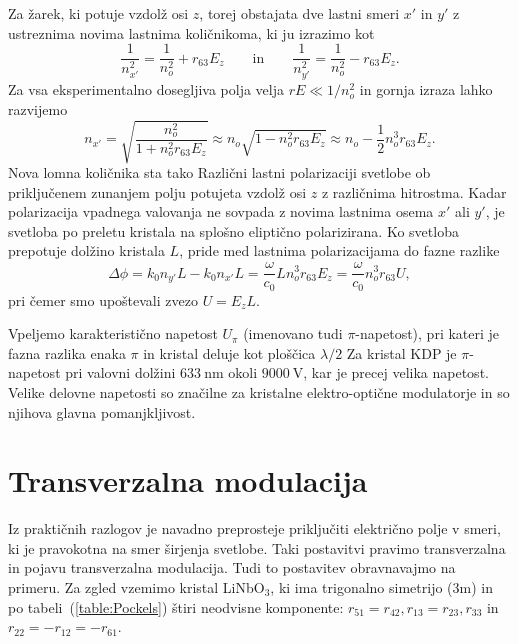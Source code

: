 Za žarek, 
ki potuje vzdolž osi $z$, torej obstajata dve lastni smeri $x'$ in $y'$ z ustreznima
novima lastnima količnikoma, ki ju izrazimo kot
\begin{equation}
\frac{1}{n_{x'}^2} = \frac{1}{n_o^2}+ r_{63}E_z \qquad \mathrm{in} \qquad 
\frac{1}{n_{y'}^2} = \frac{1}{n_o^2}- r_{63}E_z. 
\end{equation}
Za vsa eksperimentalno dosegljiva polja velja $rE\ll1/n_o^2$ in 
gornja izraza lahko razvijemo
\begin{equation}
n_{x'} = \sqrt{\frac{n_o^2}{1+ n_o^2 r_{63}E_z}} \approx n_o \sqrt{1- n_o^2 r_{63}E_z} \approx
n_o - \frac{1}{2}n_o^3 r_{63}E_z.
\end{equation}
Nova lomna količnika sta tako 
Različni lastni polarizaciji svetlobe  ob priključenem zunanjem polju potujeta vzdolž osi $z$ z različnima hitrostma. 
Kadar polarizacija vpadnega valovanja ne sovpada z novima lastnima osema $x'$ ali $y'$, je 
svetloba po preletu kristala na splošno eliptično polarizirana. Ko svetloba
prepotuje dolžino kristala $L$, pride med lastnima polarizacijama do fazne razlike
\begin{equation}
\Delta \phi = k_0 n_{y'} L - k_0 n_{x'} L = \frac{\omega}{c_0}L 
n_o^3 r_{63}E_z = \frac{\omega}{c_0} n_o^3 r_{63}U,
\label{phiAM}
\end{equation} 
pri čemer smo upoštevali zvezo $U = E_zL$. 

Vpeljemo karakteristično napetost $U_\pi$ (imenovano tudi $\pi$-napetost), 
pri kateri je 
fazna razlika enaka $\pi$ in kristal deluje kot ploščica $\lambda/2$
Za kristal KDP je $\pi$-napetost pri valovni 
dolžini $633~\si{\nano\metre}$ okoli  $9000~\si{\volt}$, kar 
je precej velika napetost. Velike delovne napetosti
so značilne za kristalne elektro-optične modulatorje in so njihova
glavna pomanjkljivost. 

\section{Transverzalna modulacija}
Iz praktičnih razlogov je navadno preprosteje priključiti električno polje v smeri, ki 
je pravokotna na smer širjenja svetlobe. Taki postavitvi pravimo transverzalna in pojavu
transverzalna modulacija.
Tudi to postavitev obravnavajmo na primeru. Za zgled vzemimo kristal LiNbO$_3$, ki 
ima trigonalno simetrijo (3m) in po tabeli~(\ref{table:Pockels}) štiri 
neodvisne komponente: $r_{51}=r_{42}, r_{13}=r_{23}, r_{33}$ in $r_{22}=-r_{12}=-r_{61}$.

